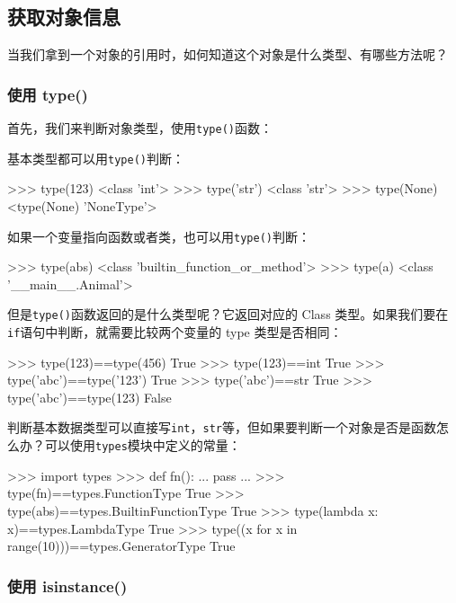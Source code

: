 \hypertarget{ux83b7ux53d6ux5bf9ux8c61ux4fe1ux606f}{%
\subsection{获取对象信息}\label{ux83b7ux53d6ux5bf9ux8c61ux4fe1ux606f}}

当我们拿到一个对象的引用时，如何知道这个对象是什么类型、有哪些方法呢？

\hypertarget{ux4f7fux7528-type}{%
\subsubsection{使用 type()}\label{ux4f7fux7528-type}}

首先，我们来判断对象类型，使用\texttt{type()}函数：

基本类型都可以用\texttt{type()}判断：

\begin{pythoncode}
>>> type(123)
<class 'int'>
>>> type('str')
<class 'str'>
>>> type(None)
<type(None) 'NoneType'>
\end{pythoncode}

如果一个变量指向函数或者类，也可以用\texttt{type()}判断：

\begin{pythoncode}
>>> type(abs)
<class 'builtin_function_or_method'>
>>> type(a)
<class '__main__.Animal'>
\end{pythoncode}

但是\texttt{type()}函数返回的是什么类型呢？它返回对应的 Class
类型。如果我们要在\texttt{if}语句中判断，就需要比较两个变量的 type
类型是否相同：

\begin{pythoncode}
>>> type(123)==type(456)
True
>>> type(123)==int
True
>>> type('abc')==type('123')
True
>>> type('abc')==str
True
>>> type('abc')==type(123)
False
\end{pythoncode}

判断基本数据类型可以直接写\texttt{int}，\texttt{str}等，但如果要判断一个对象是否是函数怎么办？可以使用\texttt{types}模块中定义的常量：

\begin{pythoncode}
>>> import types
>>> def fn():
...     pass
...
>>> type(fn)==types.FunctionType
True
>>> type(abs)==types.BuiltinFunctionType
True
>>> type(lambda x: x)==types.LambdaType
True
>>> type((x for x in range(10)))==types.GeneratorType
True
\end{pythoncode}

\hypertarget{ux4f7fux7528-isinstance}{%
\subsubsection{使用 isinstance()}\label{ux4f7fux7528-isinstance}}

